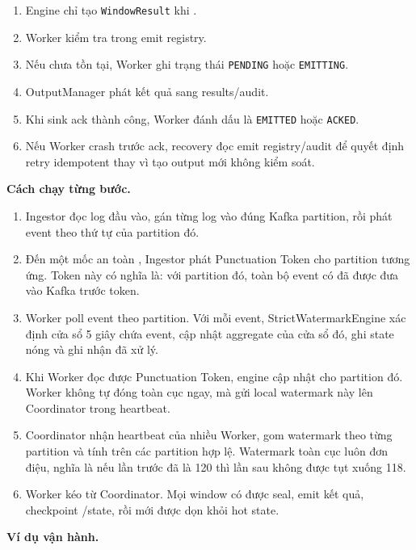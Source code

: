 \documentclass[12pt,a4paper]{article}
\begin{document}
\begin{enumerate}
\item Engine chỉ tạo \texttt{WindowResult} khi .
\item Worker kiểm tra  trong emit registry.
\item Nếu  chưa tồn tại, Worker ghi trạng thái \texttt{PENDING} hoặc \texttt{EMITTING}.
\item OutputManager phát kết quả sang results/audit.
\item Khi sink ack thành công, Worker đánh dấu  là \texttt{EMITTED} hoặc \texttt{ACKED}.
\item Nếu Worker crash trước ack, recovery đọc emit registry/audit để quyết định retry idempotent thay vì tạo output mới không kiểm soát.
\end{enumerate}
\textbf{Cách chạy từng bước.}

\begin{enumerate}
\item Ingestor đọc log đầu vào, gán từng log vào đúng Kafka partition, rồi phát event theo thứ tự  của partition đó.
\item Đến một mốc an toàn , Ingestor phát Punctuation Token cho partition tương ứng. Token này có nghĩa là: với partition đó, toàn bộ event có  đã được đưa vào Kafka trước token.
\item Worker poll event theo partition. Với mỗi event, StrictWatermarkEngine xác định cửa sổ 5 giây chứa event, cập nhật aggregate của cửa sổ đó, ghi state nóng và ghi nhận  đã xử lý.
\item Khi Worker đọc được Punctuation Token, engine cập nhật  cho partition đó. Worker không tự đóng toàn cục ngay, mà gửi local watermark này lên Coordinator trong heartbeat.
\item Coordinator nhận heartbeat của nhiều Worker, gom watermark theo từng partition và tính  trên các partition hợp lệ. Watermark toàn cục luôn đơn điệu, nghĩa là nếu lần trước đã là 120 thì lần sau không được tụt xuống 118.
\item Worker kéo  từ Coordinator. Mọi window có  được seal, emit kết quả, checkpoint /state, rồi mới được dọn khỏi hot state.
\end{enumerate}
\textbf{Ví dụ vận hành.}
\end{document}
